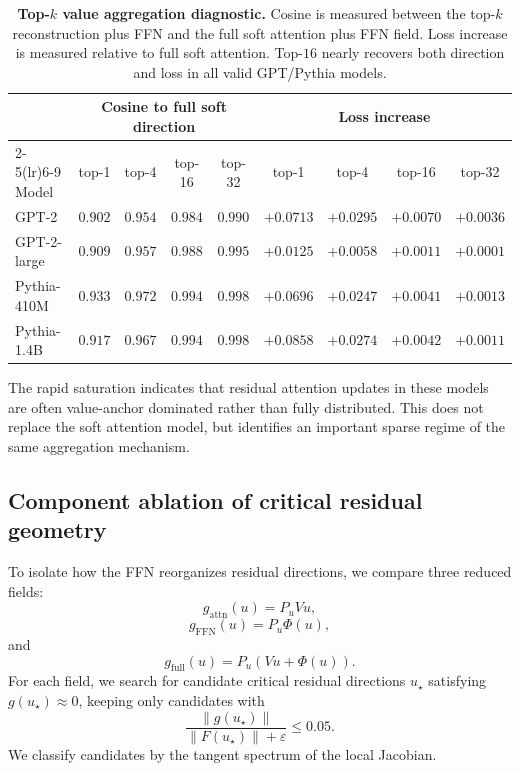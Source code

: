 \documentclass[11pt]{article}
\begin{document}
\begin{table}[t]
\centering
\small
\caption{\textbf{Top-$k$ value aggregation diagnostic.}  Cosine is measured
between the top-$k$ reconstruction plus FFN and the full soft attention plus FFN
field.  Loss increase is measured relative to full soft attention.  Top-$16$
nearly recovers both direction and loss in all valid GPT/Pythia models.}
\label{tab:supp-hard-value-topk}
\begin{tabular}{lcccccccc}
\toprule
 & \multicolumn{4}{c}{Cosine to full soft direction} & \multicolumn{4}{c}{Loss increase} \\
\cmidrule(lr){2-5}\cmidrule(lr){6-9}
Model & top-1 & top-4 & top-16 & top-32 & top-1 & top-4 & top-16 & top-32 \\
\midrule
GPT-2        & $0.902$ & $0.954$ & $0.984$ & $0.990$ & $+0.0713$ & $+0.0295$ & $+0.0070$ & $+0.0036$ \\
GPT-2-large  & $0.909$ & $0.957$ & $0.988$ & $0.995$ & $+0.0125$ & $+0.0058$ & $+0.0011$ & $+0.0001$ \\
Pythia-410M  & $0.933$ & $0.972$ & $0.994$ & $0.998$ & $+0.0696$ & $+0.0247$ & $+0.0041$ & $+0.0013$ \\
Pythia-1.4B  & $0.917$ & $0.967$ & $0.994$ & $0.998$ & $+0.0858$ & $+0.0274$ & $+0.0042$ & $+0.0011$ \\
\bottomrule
\end{tabular}
\end{table}

The rapid saturation indicates that residual attention updates in these models
are often value-anchor dominated rather than fully distributed.  This does not
replace the soft attention model, but identifies an important sparse regime of
the same aggregation mechanism.

\subsection{Component ablation of critical residual geometry}\label{app:component-geometry}
To isolate how the FFN reorganizes residual directions, we compare three reduced
fields:
\begin{equation}
g_{\mathrm{attn}}(u)=P_uVu,
\end{equation}
\begin{equation}
g_{\mathrm{FFN}}(u)=P_u\Phi(u),
\end{equation}
and
\begin{equation}
g_{\mathrm{full}}(u)=P_u\left(Vu+\Phi(u)\right).
\end{equation}
For each field, we search for candidate critical residual directions
$u_\star$ satisfying $g(u_\star)\approx0$, keeping only candidates with
\begin{equation}
\frac{\|g(u_\star)\|}{\|F(u_\star)\|+\varepsilon}
\leq
0.05.
\end{equation}
We classify candidates by the tangent spectrum of the local Jacobian.
\end{document}
